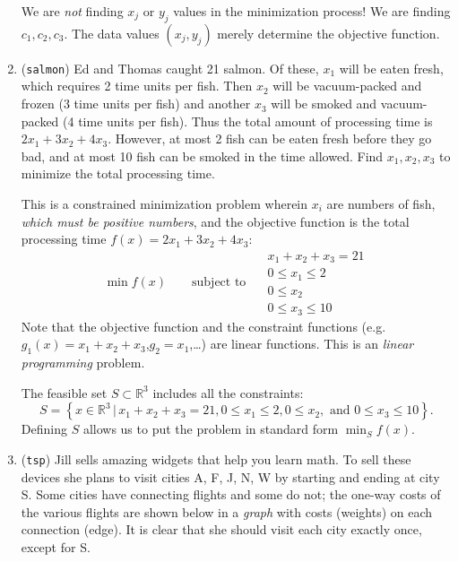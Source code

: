 \documentclass[11pt]{amsart}
\newcommand{\RR}{\mathbb{R}}
\begin{document}
\begin{enumerate}
We are \emph{not} finding $x_j$ or $y_j$ values in the minimization process!  We are finding $c_1,c_2,c_3$.  The data values $(x_j,y_j)$ merely determine the objective function.

\medskip
\item (\texttt{salmon})  \quad Ed and Thomas caught 21 salmon.  Of these, $x_1$ will be eaten fresh, which requires 2 time units per fish.  Then $x_2$ will be vacuum-packed and frozen (3 time units per fish) and another $x_3$ will be smoked and vacuum-packed (4 time units per fish).  Thus the total amount of processing time is $2 x_1 + 3 x_2 + 4 x_3$.  However, at most 2 fish can be eaten fresh before they go bad, and at most 10 fish can be smoked in the time allowed.  Find $x_1,x_2,x_3$ to minimize the total processing time.

This is a constrained minimization problem wherein $x_i$ are numbers of fish, \emph{which must be positive numbers}, and the objective function is the total processing time $f(x) = 2 x_1 + 3 x_2 + 4 x_3$:
	$$\min f(x) \qquad \text{subject to }\quad \begin{matrix} x_1 + x_2 + x_3 = 21 \\ 0 \le x_1 \le 2 \\ 0 \le x_2 \\ 0 \le x_3 \le 10 \end{matrix}$$
Note that the objective function and the constraint functions (e.g.~$g_1(x)=x_1+x_2+x_3$,$g_2=x_1$,\dots) are linear functions.  This is an \emph{linear programming} problem.

The feasible set $S\subset \RR^3$ includes all the constraints:
    $$S = \left\{x \in \RR^3\,\big|\,x_1 + x_2 + x_3 = 21, 0 \le x_1 \le 2, 0 \le x_2, \text{ and } 0 \le x_3 \le 10\right\}.$$
Defining $S$ allows us to put the problem in standard form $\min_S f(x)$.

\medskip
\item (\texttt{tsp})  \quad Jill sells amazing widgets that help you learn math.  To sell these devices she plans to visit cities A, F, J, N, W by starting and ending at city S.  Some cities have connecting flights and some do not; the one-way costs of the various flights are shown below in a \emph{graph} with costs (weights) on each connection (edge).  It is clear that she should visit each city exactly once, except for S.

\begin{center}
\vspace{-5mm}
\end{center}
\end{enumerate}
\end{document}
